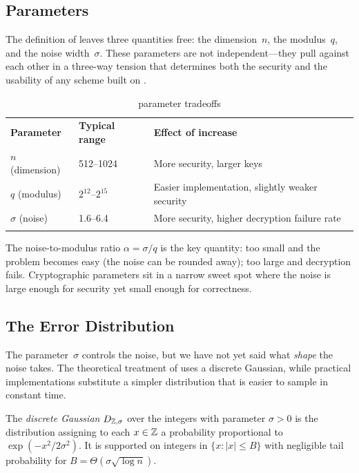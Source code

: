 \subsection{Parameters}
\label{subsec:lwe-params}

The definition of \lwe{} leaves three quantities free: the dimension~$n$, the modulus~$q$, and the noise width~$\sigma$.  These parameters are not independent---they pull against each other in a three-way tension that determines both the security and the usability of any scheme built on \lwe{}.

\begin{table}[t]
\caption{\lwe{} parameter tradeoffs}
\label{tab:lwe-params}
\begin{tabular}{p{2cm}p{3cm}p{6cm}}
\hline\noalign{\smallskip}
\textbf{Parameter} & \textbf{Typical range} & \textbf{Effect of increase} \\
\noalign{\smallskip}\svhline\noalign{\smallskip}
$n$ (dimension) & 512--1024 & More security, larger keys \\
$q$ (modulus)    & $2^{12}$--$2^{15}$ & Easier implementation, slightly weaker security \\
$\sigma$ (noise) & 1.6--6.4  & More security, higher decryption failure rate \\
\noalign{\smallskip}\hline
\end{tabular}
\end{table}

The noise-to-modulus ratio $\alpha = \sigma/q$ is the key quantity: too small and the problem becomes easy (the noise can be rounded away); too large and decryption fails.  Cryptographic parameters sit in a narrow sweet spot where the noise is large enough for security yet small enough for correctness.


\subsection{The Error Distribution}
\label{subsec:error-distribution}

The parameter~$\sigma$ controls the noise, but we have not yet said what \emph{shape} the noise takes.  The theoretical treatment of \lwe{} uses a discrete Gaussian, while practical implementations substitute a simpler distribution that is easier to sample in constant time.

\begin{definition}
\label{def:discrete-gaussian}
The \emph{discrete Gaussian} $D_{\mathbb{Z},\sigma}$ over the integers with parameter $\sigma > 0$ is the distribution assigning to each $x \in \mathbb{Z}$ a probability proportional to $\exp(-x^2 / 2\sigma^2)$.  It is supported on integers in $\{x : |x| \leq B\}$ with negligible tail probability for $B = \Theta(\sigma\sqrt{\log n})$.
\end{definition}

